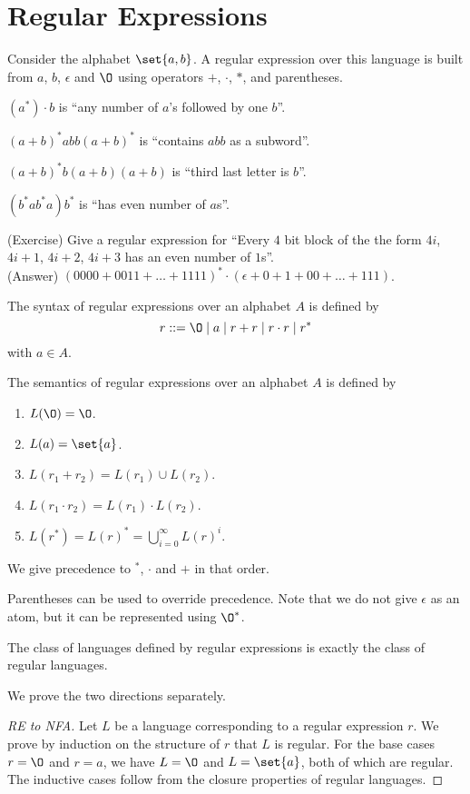 \section{Regular Expressions} \label{sec:regex}
Consider the alphabet $\set{a, b}$.
A regular expression over this language is built from $a$, $b$, $\epsilon$
and $\O$ using operators $+$, $\cdot$, $*$, and parentheses.
\begin{examples}
    \item $(a^*)\cdot b$ is ``any number of $a$'s followed by one $b$''.
    \item $(a + b)^*abb(a + b)^*$ is ``contains $abb$ as a subword''.
    \item $(a+b)^*b(a+b)(a+b)$ is ``third last letter is $b$''.
    \item $(b^*ab^*a)b^*$ is ``has even number of $a$s''.
    \item (Exercise) Give a regular expression for ``Every $4$ bit block of
    the the form $4i$, $4i+1$, $4i+2$, $4i+3$ has an even number of $1$s''.
    \\
    (Answer) $(0000 + 0011 + \dots + 1111)^*\cdot(\epsilon + 0 + 1 + 00 + \dots + 111)$.
\end{examples}

\begin{definition*} \label{def:regex}
    The syntax of regular expressions over an alphabet $A$ is defined by \[
        r ::= \O \mid a \mid r + r \mid r \cdot r \mid r^*
    \] with $a \in A$.

    The semantics of regular expressions over an alphabet $A$ is defined by
    \begin{enumerate}
        \item $L(\O) = \O$.
        \item $L(a) = \set{a}$.
        \item $L(r_1 + r_2) = L(r_1) \cup L(r_2)$.
        \item $L(r_1 \cdot r_2) = L(r_1) \cdot L(r_2)$.
        \item $L(r^*) = L(r)^* = \bigcup_{i = 0}^\infty L(r)^i$.
    \end{enumerate}
    We give precedence to $^*$, $\cdot$ and $+$ in that order.
\end{definition*}
Parentheses can be used to override precedence.
Note that we do not give $\epsilon$ as an atom, but it can be represented
using $\O^*$.

\begin{theorem*} \label{thm:regex:kleene}
    The class of languages defined by regular expressions is exactly the
    class of regular languages.
\end{theorem*}
We prove the two directions separately.
\begin{proof}[RE to NFA]
    Let $L$ be a language corresponding to a regular expression $r$.
    We prove by induction on the structure of $r$ that $L$ is regular.
    For the base cases $r = \O$ and $r = a$, we have $L = \O$ and
    $L = \set{a}$, both of which are regular.
    The inductive cases follow from the closure properties of regular
    languages.
\end{proof}
